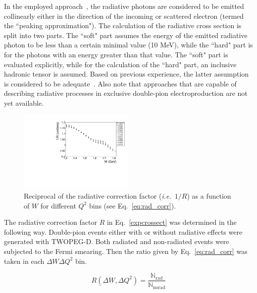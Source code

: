 \documentclass[prc,twocolumn,superscriptaddress,showpacs,amssymb,amsmath,amsfonts,aps,nofootinbib]{revtex4-1}
\begin{document}
In the employed approach~\cite{Mo:1968cg,twopeg,twopeg-d}, the radiative photons are considered to be emitted collinearly either in the direction of the incoming or scattered electron (termed the ``peaking approximation"). The calculation of the radiative cross section is split into two parts. The ``soft" part assumes the energy of the emitted radiative photon to be less than a certain minimal value (10 MeV), while the ``hard" part is for the photons with an energy greater than that value. The ``soft" part is evaluated explicitly, while for the calculation of the ``hard" part, an inclusive hadronic tensor is assumed. Based on previous experience, the latter assumption is considered to be adequate~\cite{Rip_an_note:2002,Ripani:2002ss,Fed_an_note:2007,Fedotov:2008aa,Fed_an_note:2017,Fed_paper_2018,Isupov:2017lnd,Arjun}. Also note that approaches that are capable of describing radiative processes in exclusive double-pion electroproduction are not yet available.


\begin{figure}[htp]
\begin{center}
\includegraphics[width=0.5\textwidth]{pictures/corrections/radcorr.pdf}
\caption{\small Reciprocal of the radiative correction factor ({\it i.e.}~$1/R$) as a function of $W$ for different $Q^{2}$ bins (see Eq.\!~\eqref{eq:rad_corr}).} \label{fig:radcorr}
\end{center}
\end{figure}
The radiative correction factor $R$ in Eq.\!~\eqref{expcrossect} was determined in the following way. Double-pion events either with or without radiative effects were generated with TWOPEG-D. Both radiated and non-radiated events were subjected to the Fermi smearing. Then the ratio given by Eq.\!~\eqref{eq:rad_corr} was taken in each $\Delta W \Delta Q^{2}$ bin.

\begin{equation}
R(\Delta W, \Delta Q^{2}) = \frac{\mathbb{N}_{\text{rad}}}{\mathbb{N}_{\text{norad}}}
\label{eq:rad_corr}
\end{equation}
\end{document}
